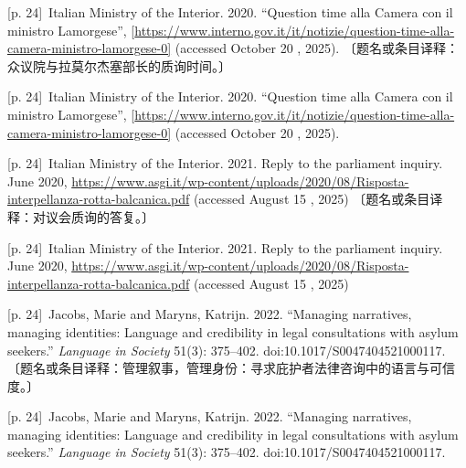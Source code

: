 \documentclass[10pt,a4paper]{article}
\begin{document}
\noindent\begin{minipage}{\textwidth}\begin{minipage}[t]{\dimexpr.5\textwidth-4mm\relax}{\scriptsize\color{gray} [p. 24]}\ Italian Ministry of the Interior. 2020. “Question time alla Camera con il ministro Lamorgese”, [\url{https://www.interno.gov.it/it/notizie/question-time-alla-camera-ministro-lamorgese-0]} (accessed October 20 , 2025). 〔题名或条目译释：众议院与拉莫尔杰塞部长的质询时间。〕\par\end{minipage}\hfill\begin{minipage}[t]{\dimexpr.5\textwidth-4mm\relax}{\scriptsize\color{gray} [p. 24]}\ Italian Ministry of the Interior. 2020. “Question time alla Camera con il ministro Lamorgese”, [\url{https://www.interno.gov.it/it/notizie/question-time-alla-camera-ministro-lamorgese-0]} (accessed October 20 , 2025).\par\end{minipage}\end{minipage}\par
\noindent\begin{minipage}{\textwidth}\begin{minipage}[t]{\dimexpr.5\textwidth-4mm\relax}{\scriptsize\color{gray} [p. 24]}\ Italian Ministry of the Interior. 2021. Reply to the parliament inquiry. June 2020, \url{https://www.asgi.it/wp-content/uploads/2020/08/Risposta-interpellanza-rotta-balcanica.pdf} (accessed August 15 , 2025) 〔题名或条目译释：对议会质询的答复。〕\par\end{minipage}\hfill\begin{minipage}[t]{\dimexpr.5\textwidth-4mm\relax}{\scriptsize\color{gray} [p. 24]}\ Italian Ministry of the Interior. 2021. Reply to the parliament inquiry. June 2020, \url{https://www.asgi.it/wp-content/uploads/2020/08/Risposta-interpellanza-rotta-balcanica.pdf} (accessed August 15 , 2025)\par\end{minipage}\end{minipage}\par
\noindent\begin{minipage}{\textwidth}\begin{minipage}[t]{\dimexpr.5\textwidth-4mm\relax}{\scriptsize\color{gray} [p. 24]}\ Jacobs, Marie and Maryns, Katrijn. 2022. “Managing narratives, managing identities: Language and credibility in legal consultations with asylum seekers.” \textit{Language in Society} 51(3): 375–402. doi:10.1017/S0047404521000117. 〔题名或条目译释：管理叙事，管理身份：寻求庇护者法律咨询中的语言与可信度。〕\par\end{minipage}\hfill\begin{minipage}[t]{\dimexpr.5\textwidth-4mm\relax}{\scriptsize\color{gray} [p. 24]}\ Jacobs, Marie and Maryns, Katrijn. 2022. “Managing narratives, managing identities: Language and credibility in legal consultations with asylum seekers.” \textit{Language in Society} 51(3): 375–402. doi:10.1017/S0047404521000117.\par\end{minipage}\end{minipage}\par
\end{document}
